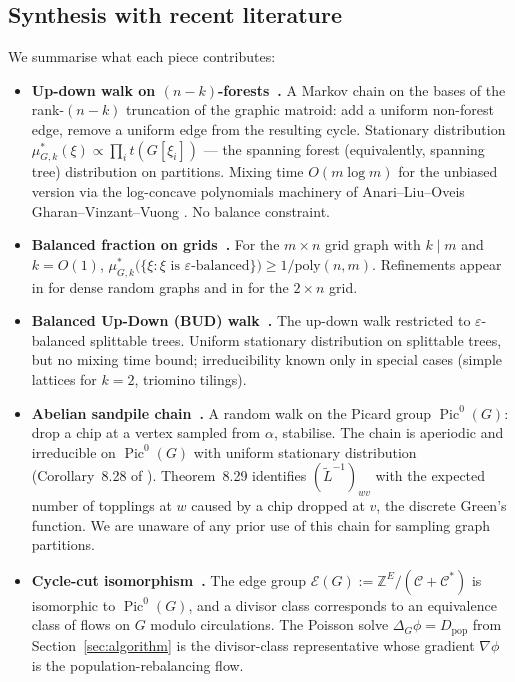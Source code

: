 \documentclass[11pt]{article}
\newcommand{\Z}{\mathbb{Z}}
\newcommand{\Pic}{\operatorname{Pic}^0}
\begin{document}
\subsection{Synthesis with recent literature}\label{sec:lit-synth}

We summarise what each piece contributes:

\begin{itemize}
  \item \textbf{Up-down walk on $(n-k)$-forests~\cite{charikar2023complexity}.}
    A Markov chain on the bases of the rank-$(n-k)$ truncation of the graphic
    matroid: add a uniform non-forest edge, remove a uniform edge from the
    resulting cycle. Stationary distribution
    $\mu^*_{G,k}(\xi) \propto \prod_i t(G[\xi_i])$ --- the spanning forest
    (equivalently, spanning tree) distribution on partitions.
    Mixing time $O(m \log m)$ for the unbiased version via the log-concave
    polynomials machinery of Anari--Liu--Oveis Gharan--Vinzant--Vuong
    \cite{anari2021logconcave}. No balance constraint.
  \item \textbf{Balanced fraction on grids~\cite{cannon2024sampling}.} For the
    $m \times n$ grid graph with $k \mid m$ and $k = O(1)$,
    $\mu^*_{G,k}\bigl(\{\xi : \xi\text{ is }\varepsilon\text{-balanced}\}\bigr)
    \geq 1 / \mathrm{poly}(n,m)$. Refinements appear in
    \cite{gillman2025splittable} for dense random graphs and in
    \cite{gallagher2025balanced} for the $2 \times n$ grid.
  \item \textbf{Balanced Up-Down (BUD) walk~\cite{akitaya2026bud}.} The
    up-down walk restricted to $\varepsilon$-balanced splittable trees.
    Uniform stationary distribution on splittable trees, but no mixing time
    bound; irreducibility known only in special cases (simple lattices for
    $k=2$, triomino tilings).
  \item \textbf{Abelian sandpile chain~\cite[Chapter~8]{corry2018divisors}.}
    A random walk on the Picard group $\Pic(G)$: drop a chip at a vertex
    sampled from $\alpha$, stabilise. The chain is aperiodic and
    irreducible on $\Pic(G)$ with uniform stationary distribution
    (Corollary~8.28 of \cite{corry2018divisors}). Theorem~8.29 identifies
    $(\widetilde{L}^{-1})_{wv}$ with the expected number of topplings at
    $w$ caused by a chip dropped at $v$, the discrete Green's function. We
    are unaware of any prior use of this chain for sampling graph partitions.
  \item \textbf{Cycle-cut isomorphism~\cite[Chapter~13]{corry2018divisors}.}
    The edge group $\mathcal{E}(G) := \Z^E / (\mathcal{C} + \mathcal{C}^*)$
    is isomorphic to $\Pic(G)$, and a divisor class corresponds to an
    equivalence class of flows on $G$ modulo circulations. The Poisson
    solve $\Delta_G \phi = D_{\mathrm{pop}}$ from
    Section~\ref{sec:algorithm} is the divisor-class representative whose
    gradient $\nabla\phi$ is the population-rebalancing flow.
\end{itemize}
\end{document}
